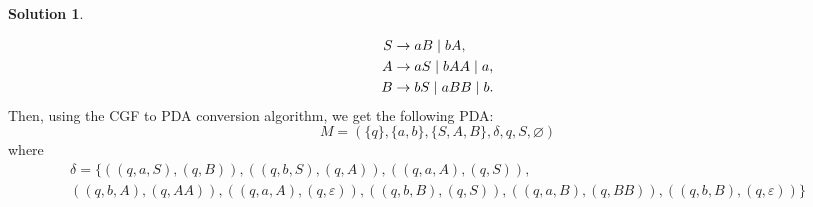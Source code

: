 \documentclass{article}
\newcommand{\es}{\varnothing}
\newcommand{\setst}{\hspace{1mm} | \hspace{1mm} }
\renewcommand{\epsilon}{\varepsilon}
\theoremstyle{definition}
\newtheorem*{solution*}{Solution}
\begin{document}
\begin{enumerate}
\begin{solution*}
\begin{enumerate}
		\begin{align*}
		S &\rightarrow aB \setst bA, \\
		A &\rightarrow aS \setst bAA \setst a, \\
		B &\rightarrow bS \setst aBB \setst b.
		\end{align*}
		Then, using the CGF to PDA conversion algorithm, we get the following PDA:
		\[M = \left(\{q\},\{a,b\}, \{S,A,B\},\delta, q, S, \es\right)\]
		where 
		\begin{multline*}
		\delta = \{((q,a,S),(q,B)),((q,b,S),(q,A)),((q,a,A),(q,S)),\\((q,b,A),(q,AA)),((q,a,A),(q,\epsilon)),((q,b,B),(q,S)),((q,a,B),(q,BB)),((q,b,B),(q,\epsilon))\}
		\end{multline*}
	\end{enumerate}
\end{solution*}
\end{enumerate}
\end{document}
